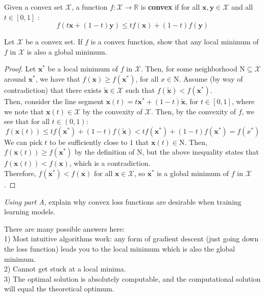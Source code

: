 Given a convex set $\mathcal{X}$, a function $f:\mathcal{X}\to\mathbb{R}$ is \textbf{convex} if for all $\textbf{x},\textbf{y}\in \mathcal{X}$ and all $t\in[0,1]$ :
\[f(t\textbf{x} + (1-t)\textbf{y}) \leq tf(\textbf{x}) + (1-t)f(\textbf{y})\]

\begin{problem}[3]
Let $\mathcal{X}$ be a convex set. If $f$ is a convex function, show that any local minimum of $f$ in $\mathcal{X}$ is also a global minimum.
\end{problem}

\begin{solution}
\begin{proof}
Let $\textbf{x}^*$ be a local minimum of $f$ in $\mathcal{X}$. Then, for some neighborhood $\mathrm N\subseteq \mathcal{X}$ around $\mathbf{x}^*$, we have that $f(\mathbf{x})\geq f(\mathbf{x}^*)$, for all $x\in \mathrm N$. Assume (by way of contradiction) that there exists $\tilde{\mathbf{x}} \in \mathcal{X}$ such that $f(\tilde{\mathbf{x}}) < f(\mathbf{x}^*)$.\\

Then, consider the line segment $\mathbf{x}(t) = t\mathbf{x}^* + (1-t)\tilde{\mathbf{x}}$, for $t\in [0,1]$, where we note that $\mathbf{x}(t)\in \mathcal{X}$ by the convexity of $\mathcal{X}$. Then, by the convexity of $f$, we see that for all $t\in(0,1)$: 
\[f(\mathbf{x}(t)) \leq tf(\mathbf{x}^*) + (1-t)f(\tilde{\mathbf{x}}) < tf(\mathbf{x}^*) + (1-t)f(\mathbf{x}^*) = f(x^*)\]
We can pick $t$ to be sufficiently close to $1$ that $\mathbf{x}(t) \in \mathrm N$. Then, $f(\mathbf{x}(t)) \geq f(\mathbf{x}^*)$ by the definition of $\mathrm N$, but the above inequality states that $f(\mathbf{x}(t)) < f(\mathbf{x})$, which is a contradiction. \\

Therefore, $f(\mathbf{x}^*) < f(\mathbf{x})$ for all $\mathbf{x}\in\mathcal{X}$, so $\mathbf{x}^*$ is a global minimum of $f$ in $\mathcal{X}$. \qedhere
\end{proof}
\end{solution}

\begin{problem}[4]
\emph{Using part A}, explain why convex loss functions are desirable when training learning models.
\end{problem}

\begin{solution}
There are many possible answers here:\\
1) Most intuitive algorithms work: any form of gradient descent (just going down the loss function) leads you to the local minimum which is also the global minimum. \\
2) Cannot get stuck at a local minima.\\
3) The optimal solution is absolutely computable, and the computational solution will equal the theoretical optimum.
\end{solution}

